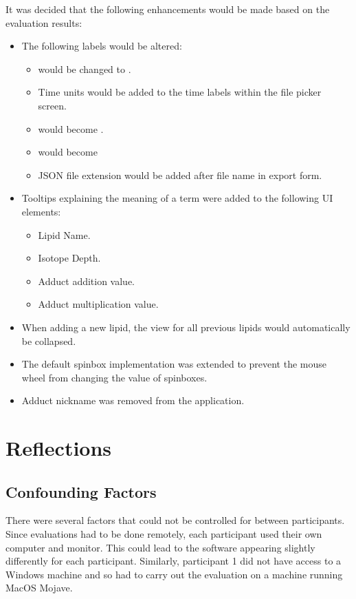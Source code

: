 \documentclass{l4proj}
\begin{document}
It was decided that the following enhancements would be made based on the evaluation results:
\begin{itemize}
    \item The following labels would be altered:
    \begin{itemize}
        \item {} would be changed to .
        \item Time units would be added to the time labels within the file picker screen.
        \item {} would become .
        \item {} would become     
        \item JSON file extension would be added after file name in export form.
    \end{itemize}
    \item Tooltips explaining the meaning of a term were added to the following UI elements:
    \begin{itemize}
        \item Lipid Name.
        \item Isotope Depth.
        \item Adduct addition value.
        \item Adduct multiplication value.
    \end{itemize}
    \item When adding a new lipid, the view for all previous lipids would automatically be collapsed.
    \item The default spinbox implementation was extended to prevent the mouse wheel from changing the value of spinboxes.
    \item Adduct nickname was removed from the application.
\end{itemize}

\section{Reflections}
\subsection{Confounding Factors}
There were several factors that could not be controlled for between participants. Since evaluations had to be done remotely, each participant used their own computer and monitor. This could lead to the software appearing slightly differently for each participant. Similarly, participant 1 did not have access to a Windows machine and so had to carry out the evaluation on a machine running MacOS Mojave. 
\end{document}
